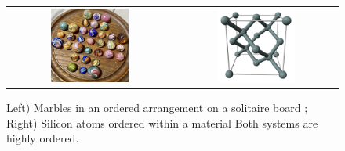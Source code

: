 \begin{figure}[H]
\centering
\begin{tabular}{ c c }

\includegraphics[width=0.5\textwidth,height=0.4\textwidth]{./images/electrical/marbles.jpg}

&
\includegraphics[width=0.5\textwidth,height=0.4\textwidth]{./images/electrical/silicon.png}
\\

\end{tabular}
\caption{Left) Marbles in an ordered arrangement on a solitaire board \cite{image_marbles}; Right) Silicon atoms ordered within a material\cite{image_silicon} Both systems are highly ordered.}
\label{fig:order}
\end{figure}

